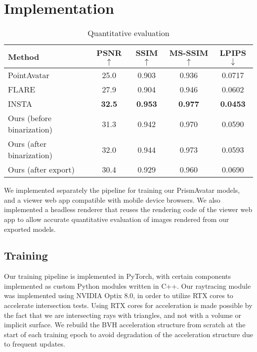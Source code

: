 \section{Implementation}
\label{sec_implementation}

\begin{table*}[h!]
    \centering

    \begin{tabularx}{300 pt}{X|c|c|c|c}
    \hline
    Method & PSNR$\uparrow$          & SSIM$\uparrow$           & MS-SSIM$\uparrow$        & LPIPS$\downarrow$           \\ \hline
    PointAvatar~\cite{zheng2023pointavatar}   & 25.0 & 0.903 & 0.936 & 0.0717 \\ 
    FLARE~\cite{bharadwaj2023flare}   & 27.9 & 0.904 & 0.946 & 0.0602 \\ 
    INSTA~\cite{zielonka2023insta}   & \textbf{32.5} & \textbf{0.953} & \textbf{0.977} & \textbf{0.0453} \\ \hline
    Ours (before binarization)   & 31.3 & 0.942 & 0.970 & 0.0590 \\ 
    Ours (after binarization)   & 32.0 & 0.944 & 0.973 & 0.0593 \\ 
    Ours (after export)   & 30.4 & 0.929 & 0.960 & 0.0690 \\ 
    \hline
    \end{tabularx}
    \caption{Quantitative evaluation }
    \label{table_quantitative}
\end{table*}

We implemented separately the pipeline for training our \mbox{PrismAvatar} models, and a viewer web app compatible with mobile device browsers. We also implemented a headless renderer that reuses the rendering code of the viewer web app to allow accurate quantitative evaluation of images rendered from our exported models.

\subsection{Training}
Our training pipeline is implemented in PyTorch, with certain components implemented as custom Python modules written in C++. Our raytracing module was implemented using NVIDIA Optix 8.0, in order to utilize RTX cores to accelerate intersection tests. Using RTX cores for acceleration is made possible by the fact that we are intersecting rays with triangles, and not with a volume or implicit surface. We rebuild the BVH acceleration structure from scratch at the start of each training epoch to avoid degradation of the acceleration structure due to frequent updates.

